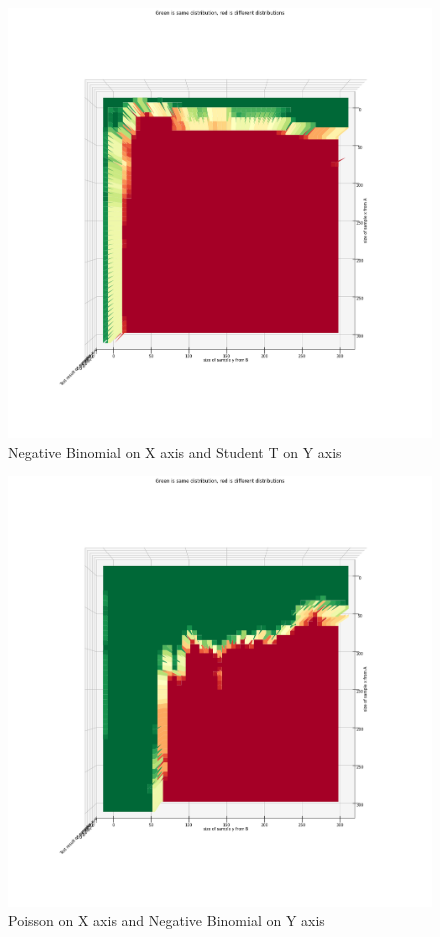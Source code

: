\begin{figure}[htb]
  \centering
  \includegraphics[width=\linewidth]{./img/hypothesis_test/appendix/ks_X_neg_bin_Y_student_t_shuffled.png}
  \caption{Negative Binomial on X axis and Student T on Y axis}
\end{figure}
\clearpage
\begin{figure}[htb]
  \centering
  \includegraphics[width=\linewidth]{./img/hypothesis_test/appendix/ks_X_poisson_Y_neg_bin_shuffled.png}
  \caption{Poisson on X axis and Negative Binomial on Y axis}
\end{figure}
